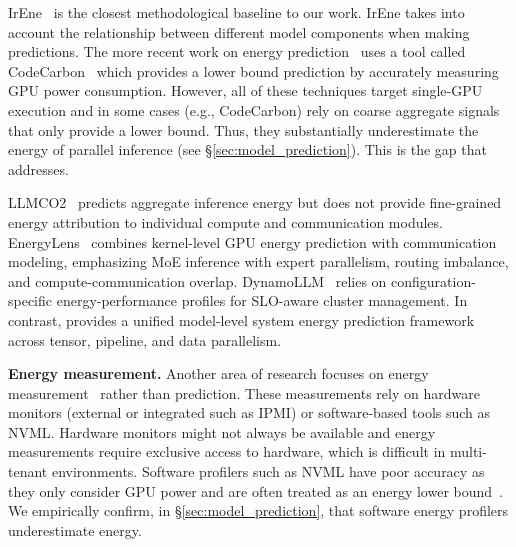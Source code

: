 IrEne~\cite{irene} is the closest methodological baseline to our work. IrEne 
takes into account the relationship between different model components when making predictions. %
The more recent work on energy prediction~\cite{Jesse-dodge-icml} uses a tool called CodeCarbon~\cite{codecarbon} which provides a lower bound prediction by accurately measuring GPU power consumption. However, all of  these techniques target single-GPU execution and in some cases (e.g., CodeCarbon) rely on coarse aggregate signals that only provide a lower bound. Thus, they substantially underestimate the energy of parallel inference (see \S\ref{sec:model_prediction}). 
This is the gap that \sys{} addresses.

LLMCO2~\cite{llmco2} predicts aggregate inference energy but does not provide fine-grained energy attribution to individual compute and communication modules. EnergyLens~\cite{energylens} combines kernel-level GPU energy prediction with communication modeling, emphasizing MoE inference with expert parallelism, routing imbalance, and compute-communication overlap. DynamoLLM~\cite{dynamollm} relies on configuration-specific energy-performance profiles for SLO-aware cluster management. In contrast, \sys{} provides a unified model-level system energy prediction framework across tensor, pipeline, and data parallelism.

\smallskip
\noindent\textbf{Energy measurement.} 
Another area of research focuses on energy measurement~\cite{lacoste2019quantifyingcarbonemissionsmachine, anthony2020carbontrackertrackingpredictingcarbon, codecarbon, energyVis, mauricio, luccioni2022estimatingcarbonfootprintbloom,dnne} rather than prediction. 
These measurements rely on hardware monitors (external or integrated such as IPMI) or software-based tools such as NVML. Hardware monitors might not always be available and energy measurements require exclusive access to hardware, which is difficult in multi-tenant environments. 
Software profilers such as NVML have poor accuracy as they only consider GPU power and are
often treated as an energy lower bound~\cite{Jesse-dodge-icml}.
We empirically confirm, in \S\ref{sec:model_prediction}, that software energy profilers underestimate energy. %

